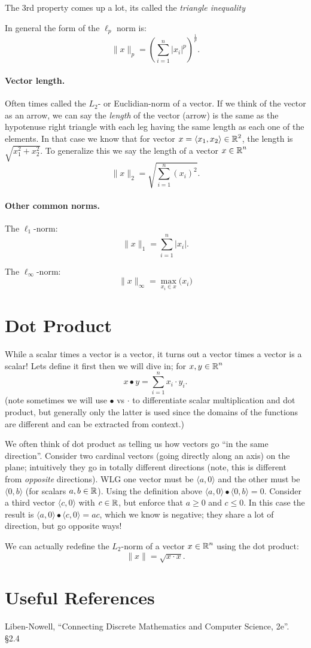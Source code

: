 The 3rd property comes up a lot, its called the \emph{triangle inequality}

In general the form of the $\ell_p$ norm is:
\[
\|x\|_p = \left(\sum_{i=1}^n \left|x_i\right|^p\right)^{\frac{1}{p}}.
\]

\paragraph{Vector length.} Often times called the $L_2$- or Euclidian-norm of a vector. 
If we think of the vector as an arrow, we can say the \emph{length} of the vector (arrow) is the same as the hypotenuse 
right triangle with each leg having the same length as each one of the elements. 
In that case we know that for vector $x = \left\langle x_1,x_2\right\rangle\in\operatorname{\mathbb{R}}^2$, the length is $\sqrt{x_1^2 + x_2^2}$.
To generalize this we say the length of a vector $x\in\operatorname{\mathbb{R}}^n$
\[
\|x\|_2 = \sqrt{\sum_{i=1}^n \left(x_i\right)^2}.
\]

\paragraph{Other common norms.}
The $\ell_1$-norm:
\[
\|x\|_1 = \sum_{i=1}^n \left|x_i\right|.
\]

The $\ell_\infty$-norm: 
\[
\|x\|_\infty = \max_{x_i \in x} \big(x_i\big)
\]


\section{Dot Product}
While a scalar times a vector is a vector, it turns out a vector times a vector is a scalar! 
Lets define it first then we will dive in;
for $x,y \in \operatorname{\mathbb{R}}^n$
\[
x \bullet y = \sum_{i=1}^n x_i \cdot y_i.
\]
(note sometimes we will use $\bullet$ vs $\cdot$ to differentiate scalar multiplication and dot product, but generally only the latter is used since the domains of the functions are different and can be extracted from context.)

We often think of dot product as telling us how vectors go ``in the same direction''. 
Consider two cardinal vectors (going directly along an axis) on the plane;
intuitively they go in totally different directions (note, this is different from \textit{opposite} directions). 
WLG one vector must be $\langle a, 0 \rangle$ and the other must be  $\langle 0,b \rangle$ (for scalars $a,b\in\operatorname{\mathbb{R}}$). 
Using the definition above $\langle a, 0 \rangle \bullet \langle 0,b \rangle = 0$.
Consider a third vector $\langle c, 0 \rangle$ with $c\in\operatorname{\mathbb{R}}$, but enforce that $a \ge 0$ and $c \le 0$. 
In this case the result is $\langle a, 0 \rangle \bullet \langle c,0 \rangle = ac$, which we know is negative; 
they share a lot of direction, but go opposite ways! 

We can actually redefine the $L_2$-norm of a vector $x\in\operatorname{\mathbb{R}}^n$ using the dot product:
\[
\|x\| = \sqrt{x \cdot x}.
\]

\section*{Useful References}
Liben-Nowell, ``Connecting Discrete Mathematics and Computer Science, 2e''. \S 2.4

